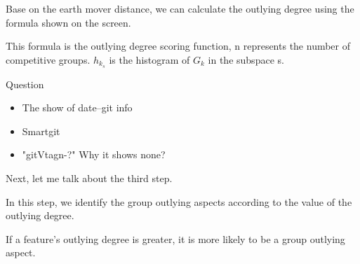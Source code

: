 \documentclass[
 size=14pt,
 paper=smartboard,  %
 mode=present, 		%
 display=slides, 	%
 style=tuliplab,  	%
 pauseslide,
 fleqn,leqno]{powerdot}
\begin{document}



\begin{note}
Base on the earth mover distance,
we can calculate the outlying degree using the formula shown on the screen.

This formula is the outlying degree scoring function,
n represents the number of competitive groups.
$h_{k_s}$ is the histogram of $G_k$ in the subspace s.
\end{note}



\begin{slide}{Question}
\begin{itemize}
\item
The show of date--git info

\item
Smartgit

\item
"gitVtagn-?" Why it shows none?
\end{itemize}

\begin{note}
Next,
let me talk about the third step.

In this step,
we identify the group outlying aspects according to the value of the outlying degree.

If a feature's outlying degree is greater,
it is more likely to be a group outlying aspect.
\end{note}

\end{slide}
\end{document}
